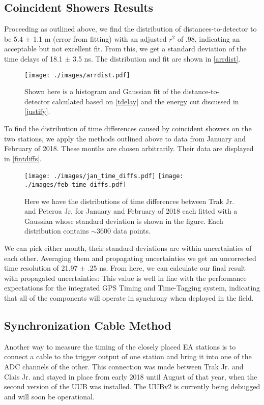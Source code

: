 \subsection{Coincident Showers Results}
Proceeding as outlined above, we find the distribution of distances-to-detector to be 5.4 $\pm$ 1.1 m (error from fitting) with an adjusted $r^2$ of .98, indicating an acceptable but not excellent fit. From this, we get a standard deviation of the time delays of 18.1 $\pm$ 3.5 ns. The distribution and fit are shown in \autoref{arrdist}.
\begin{figure}[H]
\centering
\texttt{[image: ./images/arrdist.pdf]}
\caption[Distribution of Distances-to-Detector]{Shown here is a histogram and Gaussian fit of the distance-to-detector calculated based on \autoref{tdelay} and the energy cut discussed in \autoref{justify}.}
\label{arrdist}
\end{figure}
To find the distribution of time differences caused by coincident showers on the two stations, we apply the methods outlined above to data from January and February of 2018. These months are chosen arbitrarily. Their data are displayed in \autoref{fintdiffs}.
\begin{figure}[H]
\centering
\texttt{[image: ./images/jan\_time\_diffs.pdf]}
\texttt{[image: ./images/feb\_time\_diffs.pdf]}
\caption[Coincident Shower Time Differences]{Here we have the distributions of time differences between Trak Jr. and Peteroa Jr. for January and February of 2018 each fitted with a Gaussian whose standard deviation is shown in the figure. Each distribution contains $\sim$3600 data points.}
\label{fintdiffs}
\end{figure}
We can pick either month, their standard deviations are within uncertainties of each other. Averaging them and propagating uncertainties we get an uncorrected time resolution of 21.97 $\pm$ .25 ns. From here, we can calculate our final result with propagated uncertainties:
This value is well in line with the performance expectations for the integrated GPS Timing and Time-Tagging system, indicating that all of the components will operate in synchrony when deployed in the field.
\subsection{Synchronization Cable Method}%
Another way to measure the timing of the closely placed EA stations is to connect a cable to the trigger output of one station and bring it into one of the ADC channels of the other. This connection was made between Trak Jr. and Clais Jr. and stayed in place from early 2018 until August of that year, when the second version of the UUB was installed. The UUBv2 is currently being debugged and will soon be operational. 


